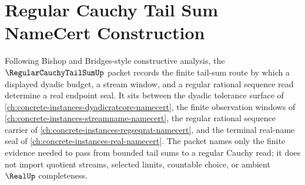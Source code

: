 \chapter{Regular Cauchy Tail Sum NameCert Construction}
\label{ch:concrete-instances-regular-cauchy-tail-sum-namecert}

Following Bishop and Bridges-style constructive analysis, the $\RegularCauchyTailSumUp$ packet records the finite tail-sum route by which a displayed dyadic budget, a stream window, and a regular rational sequence read determine a real endpoint seal. It sits between the dyadic tolerance surface of \autoref{ch:concrete-instances-dyadicratcore-namecert}, the finite observation windows of \autoref{ch:concrete-instances-streamname-namecert}, the regular rational sequence carrier of \autoref{ch:concrete-instances-regseqrat-namecert}, and the terminal real-name seal of \autoref{ch:concrete-instances-real-namecert}. The packet names only the finite evidence needed to pass from bounded tail sums to a regular Cauchy read; it does not import quotient streams, selected limits, countable choice, or ambient $\RealUp$ completeness.

